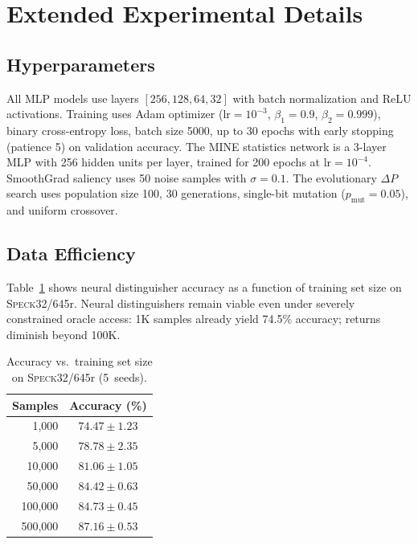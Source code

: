 \documentclass[runningheads]{llncs}
\newcommand{\speck}{\textsc{Speck32/64}}
\begin{document}
\section{Extended Experimental Details}
\label{sec:app-details}

\subsection{Hyperparameters}

All MLP models use layers $[256, 128, 64, 32]$ with batch normalization and ReLU activations.
Training uses Adam optimizer ($\text{lr} = 10^{-3}$, $\beta_1 = 0.9$, $\beta_2 = 0.999$), binary cross-entropy loss, batch size 5000, up to 30 epochs with early stopping (patience 5) on validation accuracy.
The MINE statistics network is a 3-layer MLP with 256 hidden units per layer, trained for 200 epochs at $\text{lr} = 10^{-4}$.
SmoothGrad saliency uses 50 noise samples with $\sigma = 0.1$.
The evolutionary $\Delta P$ search uses population size 100, 30 generations, single-bit mutation ($p_{\text{mut}} = 0.05$), and uniform crossover.

\subsection{Data Efficiency}

Table~\ref{tab:data-efficiency} shows neural distinguisher accuracy as a function of training set size on \speck 5r.
Neural distinguishers remain viable even under severely constrained oracle access: 1K samples already yield 74.5\% accuracy; returns diminish beyond 100K.

\begin{table}[h]
\centering
\caption{Accuracy vs.\ training set size on \speck 5r (5~seeds).}
\label{tab:data-efficiency}
\begin{tabular}{@{}rc@{}}
\toprule
\textbf{Samples} & \textbf{Accuracy (\%)} \\
\midrule
1,000     & $74.47 \pm 1.23$ \\
5,000     & $78.78 \pm 2.35$ \\
10,000    & $81.06 \pm 1.05$ \\
50,000    & $84.42 \pm 0.63$ \\
100,000   & $84.73 \pm 0.45$ \\
500,000   & $87.16 \pm 0.53$ \\
\bottomrule
\end{tabular}
\end{table}
\end{document}
